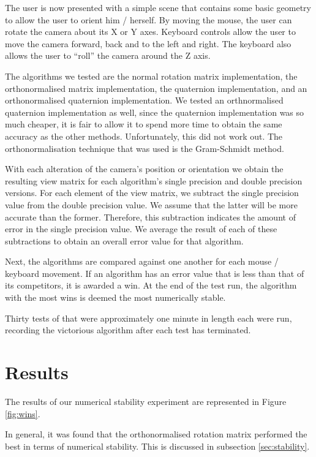 \documentclass{acm_proc_article-sp}
\begin{document}
The user is now presented with a simple scene that contains some basic geometry to allow the user to orient him / herself.
By moving the mouse, the user can rotate the camera about its X or Y axes.
Keyboard controls allow the user to move the camera forward, back and to the left and right.
The keyboard also allows the user to ``roll'' the camera around the Z axis.

The algorithms we tested are the normal rotation matrix implementation, the orthonormalised matrix implementation, the quaternion implementation, and an orthonormalised quaternion implementation.
We tested an orthnormalised quaternion implementation as well, since the quaternion implementation was so much cheaper, it is fair to allow it to spend more time to obtain the same accuracy as the other methods.
Unfortunately, this did not work out.
The orthonormalisation technique that was used is the Gram-Schmidt method.

With each alteration of the camera's position or orientation we obtain the resulting view matrix for each algorithm's single precision and double precision versions.
For each element of the view matrix, we subtract the single precision value from the double precision value.
We assume that the latter will be more accurate than the former.
Therefore, this subtraction indicates the amount of error in the single precision value.
We average the result of each of these subtractions to obtain an overall error value for that algorithm.

Next, the algorithms are compared against one another for each mouse / keyboard movement.
If an algorithm has an error value that is less than that of its competitors, it is awarded a win.
At the end of the test run, the algorithm with the most wins is deemed the most numerically stable.

Thirty tests of that were approximately one minute in length each were run, recording the victorious algorithm after each test has terminated.

\section{Results}

The results of our numerical stability experiment are represented in Figure \ref{fig:wins}.

In general, it was found that the orthonormalised rotation matrix performed the best in terms of numerical stability.
This is discussed in subsection \ref{sec:stability}.
\end{document}
